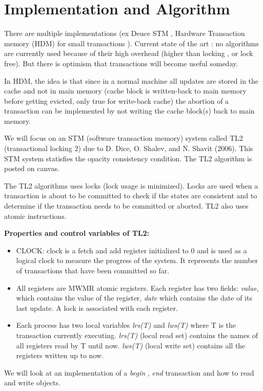 \documentclass[twoside]{article}
\begin{document}
\section{Implementation and Algorithm}
There are multiple implementations (ex Deuce STM , Hardware Transaction memory (HDM) for small transactions ). Current state of the art : no algorithms are currently used because of their high overhead (higher than locking , or lock free). But there is optimism that transactions will become useful someday.

In HDM, the idea is that since in a normal machine all updates are stored in the cache and not in main memory (cache block is written-back to main memory before getting evicted, only true for write-back cache) the abortion of a transaction can be implemented by not writing the cache block(s) back to main memory.

We will focus on an STM (software transaction memory) system called  TL2 (transactional locking 2) due to D. Dice, O. Shalev, and N. Shavit (2006). This STM system statisfies the opacity consistency condition.
The TL2 algorithm is posted on canvas.

The TL2 algorithms uses locks (lock usage is minimized). Locks are used when a transaction is about to be committed to check if the states are consistent and to determine if the transaction needs to be committed or aborted. TL2 also uses atomic instructions.

\textbf{Properties and control variables of TL2:}
\begin{itemize}
\item CLOCK: clock is a fetch and add register initialized to 0 and is used as a logical clock to measure the progress of the system. It represents the number of transactions that have been committed so far.
\item All registers are MWMR atomic registers. Each register has two fields: \textit{value}, which contains the value of the register, \textit{date} which contains the date of its last update. A lock is associated with each register. 
\item Each process has two local variables \textit{lrs(T)} and \textit{lws(T)} where T is the transaction currently executing. \textit{lrs(T)} (local read set) contains the names of all registers read by T until now. \textit{lws(T)} (local write set) contains all the registers written up to now.

\end{itemize}

We will look at an implementation of a \textit{begin} , \textit{end} transaction and how to read and write objects.
\end{document}
